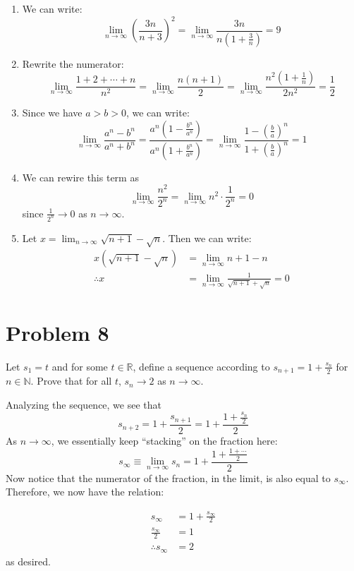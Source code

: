 \documentclass[10pt]{article}
\begin{document}
    \begin{solution}
        \begin{enumerate}[label=(\alph*)]
            \item We can write: 
            \[\lim_{n \to \infty} \left(\frac{3n}{n+3}\right)^2 = \lim_{n \to \infty} \frac{3n}{n\left( 1 + \frac 3n\right)} = 9\]
            \item Rewrite the numerator: 
            \[ \lim_{n \to \infty} \frac{1 + 2 + \cdots + n}{n^2} = \lim_{n \to \infty} \frac{n(n+1)}{2} = \lim_{n \to \infty} \frac{n^2\left( 1 + \frac 1n\right)}{2n^2} = \frac 12\]
            \item Since we have $a > b > 0$, we can write:
            \[ \lim_{n \to \infty} \frac{a^n - b^n}{a^n + b^n} = \frac{a^n \left( 1 - \frac{b^n}{a^n}\right)}{a^n\left( 1 + \frac{b^n}{a^n}\right)} = \lim_{n \to \infty} \frac{1 - \left( \frac ba\right)^n}{1 + \left(\frac ba\right)^n} = 1\]
            \item We can rewire this term as 
            \[ \lim_{n \to \infty} \frac{n^2}{2^n} = \lim_{n \to \infty} n^2 \cdot \frac{1}{2^n} = 0\]
            since $\frac{1}{2^n} \to 0$ as $n \to \infty$.
            \item Let $x = \lim_{n \to \infty} \sqrt{n+1} - \sqrt n$. Then we can write:
            \begin{align*}
                x(\sqrt{n +1} -\sqrt n) &= \lim_{n \to \infty} n+1 - n\\
                \therefore x &=\lim_{n \to \infty} \frac{1}{\sqrt{n+1} + \sqrt n} = 0
            \end{align*}
        \end{enumerate}
    \end{solution}

    \pagebreak

    \section*{Problem 8}
    Let $s_1 = t$ and for some $t \in \mathbb R$, define a sequence according to $s_{n+1} = 1 + \frac{s_n}{2}$ for $n \in \mathbb N$. Prove that for all $t$, $s_n \to 2$ as $n \to \infty$.

    \begin{solution}
        Analyzing the sequence, we see that 
        \[ s_{n+2} = 1 + \frac{s_{n+1}}{2} = 1 + \frac{1 + \frac{s_n}{2}}{2}\]
        As $n \to \infty$, we essentially keep ``stacking'' on the fraction here:
        \[ s_{\infty} \equiv \lim_{n \to \infty} s_n  = 1 + \frac{1 + \frac{1 + \cdots}{2}}{2}
        \]
        Now notice that the numerator of the fraction, in the limit, is also equal to $s_\infty$. Therefore, we now have the relation:

        \begin{align*}
            s_\infty &= 1 + \frac{s_\infty}{2}\\
            \frac{s_\infty}{2} &= 1 \\
            \therefore s_\infty &= 2
        \end{align*}
        as desired.
    \end{solution}
\end{document}
